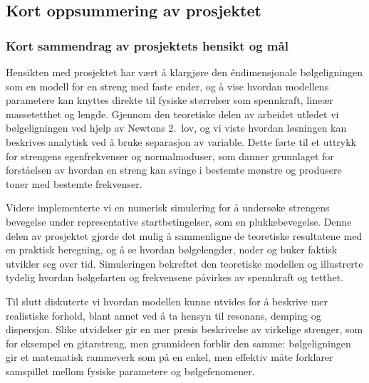 \subsection{Kort oppsummering av prosjektet}

\subsubsection{Kort sammendrag av prosjektets hensikt og mål}

Hensikten med prosjektet har vært å klargjøre den éndimensjonale bølgeligningen som en modell for en streng med faste ender, og å vise hvordan modellens parametere kan knyttes direkte til fysiske størrelser som spennkraft, lineær massetetthet og lengde. Gjennom den teoretiske delen av arbeidet utledet vi bølgeligningen ved hjelp av Newtons 2.~lov, og vi viste hvordan løsningen kan beskrives analytisk ved å bruke separasjon av variable. Dette førte til et uttrykk for strengens egenfrekvenser og normalmoduser, som danner grunnlaget for forståelsen av hvordan en streng kan svinge i bestemte mønstre og produsere toner med bestemte frekvenser.

Videre implementerte vi en numerisk simulering for å undersøke strengens bevegelse under representative startbetingelser, som en plukkebevegelse. Denne delen av prosjektet gjorde det mulig å sammenligne de teoretiske resultatene med en praktisk beregning, og å se hvordan bølgelengder, noder og buker faktisk utvikler seg over tid. Simuleringen bekreftet den teoretiske modellen og illustrerte tydelig hvordan bølgefarten og frekvensene påvirkes av spennkraft og tetthet.

Til slutt diskuterte vi hvordan modellen kunne utvides for å beskrive mer realistiske forhold, blant annet ved å ta hensyn til resonans, demping og dispersjon. Slike utvidelser gir en mer presis beskrivelse av virkelige strenger, som for eksempel en gitarstreng, men grunnideen forblir den samme: bølgeligningen gir et matematisk rammeverk som på en enkel, men effektiv måte forklarer samspillet mellom fysiske parametere og bølgefenomener.

